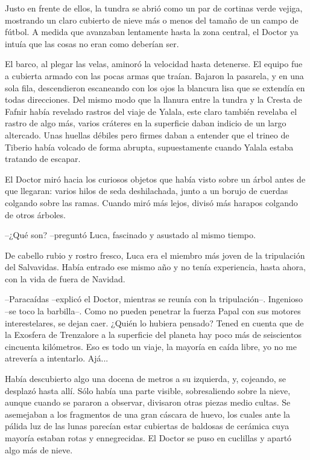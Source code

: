 Justo en frente de ellos, la tundra se abrió como un par de cortinas verde vejiga, mostrando un claro cubierto de nieve más o menos del tamaño de un campo de fútbol. A medida que avanzaban lentamente hasta la zona central, el Doctor ya intuía que las cosas no eran como deberían ser.
 
El barco, al plegar las velas, aminoró la velocidad hasta detenerse. El equipo fue a cubierta armado con las pocas armas que traían. Bajaron la pasarela, y en una sola fila, descendieron escaneando con los ojos la blancura lisa que se extendía en todas direcciones. Del mismo modo que la llanura entre la tundra y la Cresta de Fafnir había revelado rastros del viaje de Yalala, este claro también revelaba el rastro de algo más, varios cráteres en la superficie daban indicio de un largo altercado. Unas huellas débiles pero firmes daban a entender que el trineo de Tiberio había volcado de forma abrupta, supuestamente cuando Yalala estaba tratando de escapar.
 
El Doctor miró hacia los curiosos objetos que había visto sobre un árbol antes de que llegaran: varios hilos de seda deshilachada, junto a un borujo de cuerdas colgando sobre las ramas. Cuando miró más lejos, divisó más harapos colgando de otros árboles.
 
--¿Qué son? --preguntó Luca, fascinado y asustado al mismo tiempo.
 
De cabello rubio y rostro fresco, Luca era el miembro más joven de la tripulación del Salvavidas. Había entrado ese mismo año y no tenía experiencia, hasta ahora, con la vida de fuera de Navidad.
 
--Paracaídas --explicó el Doctor, mientras se reunía con la tripulación--. Ingenioso --se toco la barbilla--. Como no pueden penetrar la fuerza Papal con sus motores interestelares, se dejan caer. ¿Quién lo hubiera pensado? Tened en cuenta que de la Exosfera de Trenzalore a la superficie del planeta hay poco más de seiscientos cincuenta kilómetros. Eso es todo un viaje, la mayoría en caída libre, yo no me atrevería a intentarlo. Ajá...
 
Había descubierto algo una docena de metros a su izquierda, y, cojeando, se desplazó hasta allí. Sólo había una parte visible, sobresaliendo sobre la nieve, aunque cuando se pararon a observar, divisaron otras piezas medio cultas. Se asemejaban a los fragmentos de una gran cáscara de huevo, los cuales ante la pálida luz de las lunas parecían estar cubiertas de baldosas de cerámica cuya mayoría estaban rotas y ennegrecidas. El Doctor se puso en cuclillas y apartó algo más de nieve.
 
